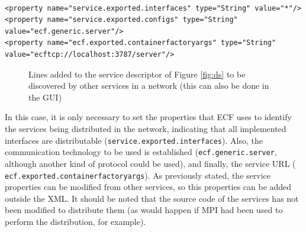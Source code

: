 \newsavebox{\mintedboxServer}
\begin{lrbox}{\mintedboxServer}
\begin{minipage}{10cm}
\begin{verbatim}

<property name="service.exported.interfaces" type="String" value="*"/>
<property name="service.exported.configs" type="String" 
value="ecf.generic.server"/>
<property name="ecf.exported.containerfactoryargs" type="String" 
value="ecftcp://localhost:3787/server"/>
\end{verbatim}
\end{minipage}
\end{lrbox}

\begin{figure}
\usebox{\mintedboxServer}
\caption{Lines added to the service descriptor of Figure \ref{fig:ds} to be discovered by other services in a network  (this can also be done in the GUI)} 
\label{fig:remote} 
\end{figure}

In this case, it is only necessary to set the properties that ECF uses to identify the services being distributed in the network, indicating that all implemented interfaces are distributable (\texttt{ser\-vi\-ce\-.ex\-por\-ted\-.in\-ter\-fa\-ces}). Also, the communication technology to be used is established (\texttt{ecf\-.ge\-ne\-ric\-.ser\-ver}, although another kind of protocol could be used), and finally, the service URL (\texttt{ ecf\-.ex\-por\-ted\-.con\-tai\-ner\-fac\-to\-ry\-args}). As previously stated, the service properties can be modified from other services, so this properties can be added outside the XML. It should be noted that the source code of the services has not been modified to distribute them (as would happen if MPI had been used to perform the distribution, for example).

